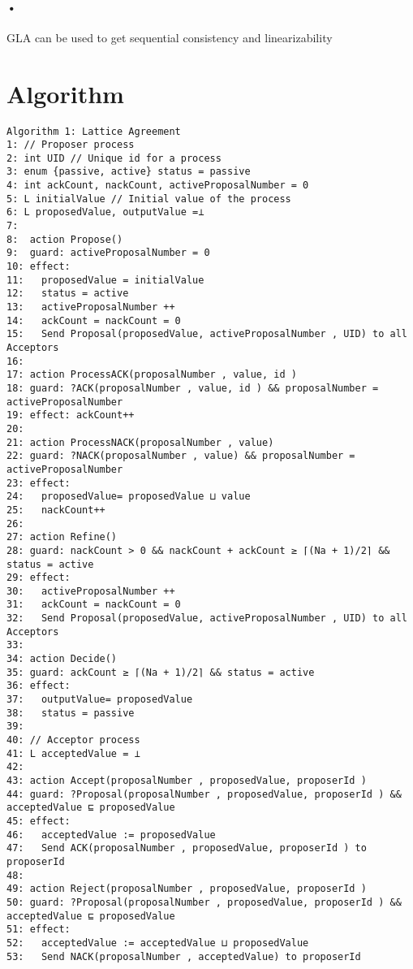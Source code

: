 \documentclass[a4paper,12pt]{report}
\begin{document}
\paragraph*{•}
GLA can be used to get sequential consistency and linearizability


\section{Algorithm}

\begin{verbatim}
Algorithm 1: Lattice Agreement
1: // Proposer process
2: int UID // Unique id for a process
3: enum {passive, active} status = passive
4: int ackCount, nackCount, activeProposalNumber = 0
5: L initialValue // Initial value of the process
6: L proposedValue, outputValue =⊥
7:
8:  action Propose()
9:  guard: activeProposalNumber = 0
10: effect:
11:   proposedValue = initialValue
12:   status = active
13:   activeProposalNumber ++
14:   ackCount = nackCount = 0
15:   Send Proposal(proposedValue, activeProposalNumber , UID) to all Acceptors
16:
17: action ProcessACK(proposalNumber , value, id )
18: guard: ?ACK(proposalNumber , value, id ) && proposalNumber = activeProposalNumber
19: effect: ackCount++
20:
21: action ProcessNACK(proposalNumber , value)
22: guard: ?NACK(proposalNumber , value) && proposalNumber = activeProposalNumber
23: effect:
24:   proposedValue= proposedValue ⊔ value
25:   nackCount++
26:
27: action Refine()
28: guard: nackCount > 0 && nackCount + ackCount ≥ ⌈(Na + 1)/2⌉ && status = active
29: effect:
30:   activeProposalNumber ++
31:   ackCount = nackCount = 0
32:   Send Proposal(proposedValue, activeProposalNumber , UID) to all Acceptors
33:
34: action Decide()
35: guard: ackCount ≥ ⌈(Na + 1)/2⌉ && status = active
36: effect:
37:   outputValue= proposedValue
38:   status = passive
39:
40: // Acceptor process
41: L acceptedValue = ⊥
42:
43: action Accept(proposalNumber , proposedValue, proposerId )
44: guard: ?Proposal(proposalNumber , proposedValue, proposerId ) && acceptedValue ⊑ proposedValue
45: effect:
46:   acceptedValue := proposedValue
47:   Send ACK(proposalNumber , proposedValue, proposerId ) to proposerId
48:
49: action Reject(proposalNumber , proposedValue, proposerId )
50: guard: ?Proposal(proposalNumber , proposedValue, proposerId ) && acceptedValue ⊑ proposedValue
51: effect:
52:   acceptedValue := acceptedValue ⊔ proposedValue
53:   Send NACK(proposalNumber , acceptedValue) to proposerId
\end{verbatim}
\end{document}
